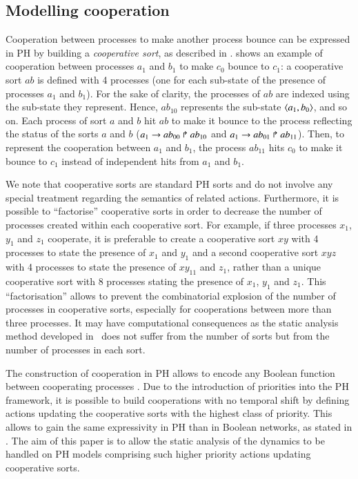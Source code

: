 


\subsection{Modelling cooperation}
\label{ssec:cooperation}

Cooperation between processes to make another process bounce can be expressed in PH by building a \emph{cooperative sort}, as described in \cite{PMR10-TCSB}.
 shows an example of cooperation between processes $a_1$ and $b_1$ to make $c_0$ bounce to $c_1$:
a cooperative sort $ab$ is defined with 4 processes (one for each sub-state of the presence of processes $a_1$ and $b_1$).
For the sake of clarity, the processes of $ab$ are indexed using the sub-state they represent.
Hence, $ab_{10}$ represents the sub-state $\mbox{$\langle a_1,b_0 \rangle$}$, and so on.
Each process of sort $a$ and $b$ hit $ab$ to make it bounce to the process reflecting the status of the sorts $a$ and $b$
(\eg $a_1\rightarrow ab_{00}\Rsh ab_{10}$ and $a_1\rightarrow ab_{01}\Rsh ab_{11}$).
Then, to represent the cooperation between $a_1$ and $b_1$, the process $ab_{11}$ hits $c_0$ to make it bounce to $c_1$ instead of independent hits from $a_1$ and $b_1$.

We note that cooperative sorts are standard PH sorts and do not involve any
special treatment regarding the semantics of related actions.
Furthermore, it is possible to “factorise” cooperative sorts in order to decrease the number of processes created within each cooperative sort.
For example, if three processes $x_1$, $y_1$ and $z_1$ cooperate,
it is preferable to create a cooperative sort $xy$ with 4 processes to state the presence of $x_1$ and $y_1$
and a second cooperative sort $xyz$ with 4 processes to state the presence of $xy_{11}$ and $z_1$,
rather than a unique cooperative sort with 8 processes stating the presence of $x_1$, $y_1$ and $z_1$.
This “factorisation” allows to prevent the combinatorial explosion of the number of processes in cooperative sorts,
especially for cooperations between more than three processes.
It may have computational consequences as the static analysis method developed in~ does not suffer from the number of sorts but from the number of processes in each sort.

The construction of cooperation in PH allows to encode any Boolean function between cooperating processes \cite{PMR10-TCSB}.
Due to the introduction of priorities into the PH framework,
it is possible to build cooperations with no temporal shift by defining actions updating the cooperative sorts with the highest class of priority.
This allows to gain the same expressivity in PH than in Boolean networks, as stated in .
The aim of this paper is to allow the static analysis of the dynamics to be handled on PH models comprising such higher priority actions updating cooperative sorts.



